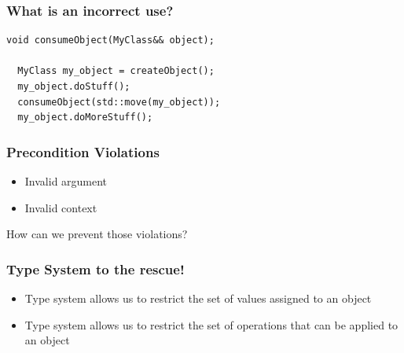 \documentclass[aspectratio=169]{beamer}
\newif\iftransitions
\newcommand{\cpause}{\iftransitions \pause \fi}
\begin{document}
\begin{frame}[fragile]
  \frametitle{What is an incorrect use?}
  
  \begin{lstlisting}[style=cpp20]
  void consumeObject(MyClass&& object);

  MyClass my_object = createObject();
  my_object.doStuff();
  consumeObject(std::move(my_object));
  my_object.doMoreStuff();
  \end{lstlisting}
  
\end{frame}



\begin{frame}
  \frametitle{Precondition Violations}
  
  \begin{itemize}
    \item Invalid argument
    \item Invalid context
  \end{itemize}
  
  \cpause
  \vspace{20pt}
  How can we prevent those violations?
  
\end{frame}

\begin{frame}
  \frametitle{Type System to the rescue!}
  
  \cpause
  
  \begin{itemize}
    \item Type system allows us to restrict the set of values assigned to an object
    \item Type system allows us to restrict the set of operations that can be applied to an object
  \end{itemize}
\end{frame}
\end{document}

